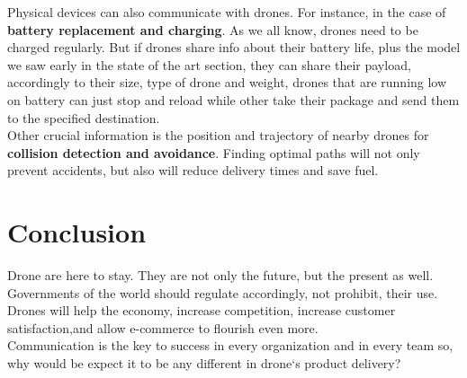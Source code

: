 \documentclass[conference]{IEEEtran}
\begin{document}
Physical devices can also communicate with drones. For instance, in the case of \textbf{battery replacement and charging}. As we all know, drones need to be charged regularly. But if drones share info about their battery life, plus the model we saw early in the state of the art section, they can share their payload, accordingly to their size, type of drone and weight, drones that are running low on battery can just stop and reload while other take their package and send them to the specified destination.\\

Other crucial information is the position and trajectory of nearby drones for \textbf{collision detection and avoidance}. Finding optimal paths will not only prevent accidents, but also will reduce delivery times and save fuel.\\


\section{Conclusion}

Drone are here to stay. They are not only the future, but the present as well. Governments of the world should regulate accordingly, not prohibit, their use.
Drones will help the economy, increase competition, increase customer satisfaction,and allow e-commerce to flourish even more.\\

Communication is the key to success in every organization and in every team so, why would be expect it to be any different in drone`s product delivery?\\




%




\nocite{*}
\end{document}
